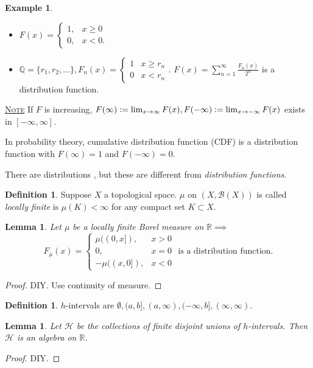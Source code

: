 \documentclass{report}
\newcommand{\R}{\mathbb{R}}
\newcommand{\Q}{\mathbb{Q}}
\newcommand{\defeq}{\vcentcolon=}
\newcommand{\fancyem}[1]{\underline{\textsc{#1}}}
\newtheorem{lemma}[theorem]{Lemma}
\theoremstyle{definition}
\newtheorem{definition}[theorem]{Definition}
\newtheorem{example}[theorem]{Example}
\theoremstyle{remark}
\newcommand{\fnl}{\parbox[t]{0\linewidth}{}}
\begin{document}
\begin{example}\fnl
\begin{itemize}
\item
$F(x) = \begin{cases}
1, & x \geq 0 \\
0, & x < 0.
\end{cases}$
\item
$\Q = \{r_1, r_2, \ldots\}, F_n(x) = \begin{cases}
1 & x \geq r_n \\
0 & x < r_n
\end{cases}$. $\displaystyle F(x) = \sum_{n=1}^\infty \frac{F_n(x)}{2^n}$ is a distribution function.
\end{itemize}
\end{example}

\fancyem{Note} If $F$ is increasing, $F(\infty) \defeq \lim_{x \to \infty} F(x), F(-\infty) \defeq \lim_{x \to -\infty} F(x)$ exists in $[-\infty, \infty]$.

In probability theory, cumulative distribution function (CDF) is a distribution function with $F(\infty) = 1$ and $F(-\infty) = 0$.

There are distributions \cite[Ch.9]{follandRealAnalysisModern1999}, but these are different from \emph{distribution functions}.

\begin{definition}
Suppose $X$ a topological space. $\mu$ on $(X, \mathcal{B}(X))$ is called \emph{locally finite} is $\mu(K) < \infty$ for any compact set $K \subset X$.
\end{definition}

\begin{lemma}
Let $\mu$ be a locally finite Borel measure on $\R \implies$
\[
F_\mu(x) = \begin{cases}
\mu((0, x]), & x > 0 \\
0, & x = 0 \\
- \mu((x, 0]), & x < 0
\end{cases} \text{ is a distribution function.}
\]
\end{lemma}
\begin{proof}
DIY. Use continuity of measure.
\end{proof}

\begin{definition}
$h$-intervals are $\emptyset, (a, b], (a, \infty), (-\infty, b], (\infty, \infty)$.
\end{definition}

\begin{lemma}
Let $\mathcal{H}$ be the collections of finite disjoint unions of $h$-intervals. Then $\mathcal{H}$ is an algebra on $\R$.
\end{lemma}
\begin{proof}
DIY.
\end{proof}
\end{document}

